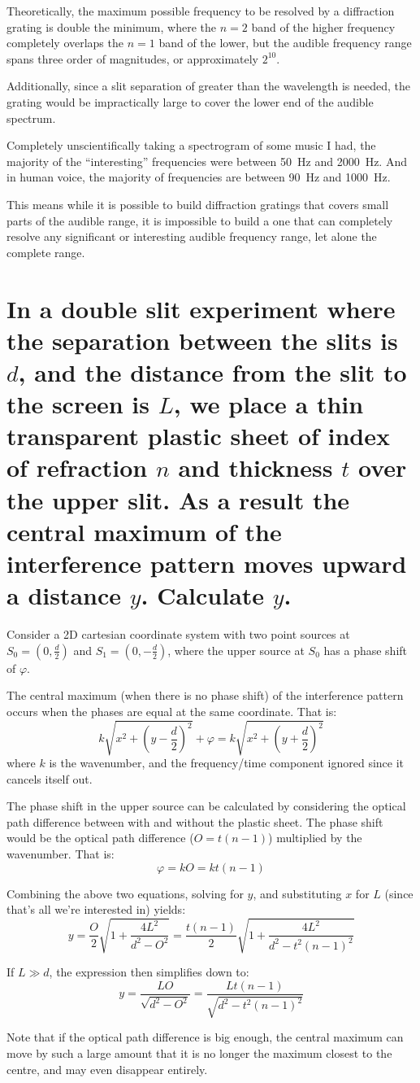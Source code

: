 \documentclass[a4paper]{scrartcl}
\begin{document}
Theoretically, the maximum possible frequency to be resolved by a diffraction grating is double the minimum, where the \(n = 2\) band of the higher frequency completely overlaps the \(n = 1\) band of the lower, but the audible frequency range spans three order of magnitudes, or approximately \(2^{10}\).

Additionally, since a slit separation of greater than the wavelength is needed, the grating would be impractically large to cover the lower end of the audible spectrum.

Completely unscientifically taking a spectrogram of some music I had, the majority of the ``interesting'' frequencies were between \SI{50}{\hertz} and \SI{2000}{\hertz}. And in human voice, the majority of frequencies are between \SI{90}{\hertz} and \SI{1000}{\hertz}.

This means while it is possible to build diffraction gratings that covers small parts of the audible range, it is impossible to build a one that can completely resolve any significant or interesting audible frequency range, let alone the complete range.

\section{In a double slit experiment where the separation between the slits is \(d\), and the distance from the slit to the screen is \(L\), we place a thin transparent plastic sheet of index of refraction \(n\) and thickness \(t\) over the upper slit. As a result the central maximum of the interference pattern moves upward a distance \(y\). Calculate \(y\).}
Consider a 2D cartesian coordinate system with two point sources at \(S_0 = (0, \frac{d}{2})\) and \(S_1 = (0, -\frac{d}{2})\), where the upper source at \(S_0\) has a phase shift of \(\varphi\).

The central maximum (when there is no phase shift) of the interference pattern occurs when the phases are equal at the same coordinate. That is:
\[k \sqrt{x^2 + \left( y - \frac{d}{2} \right)^2} + \varphi = k \sqrt{x^2 + \left( y + \frac{d}{2} \right)^2}\]
where \(k\) is the wavenumber, and the frequency/time component ignored since it cancels itself out.

The phase shift in the upper source can be calculated by considering the optical path difference between with and without the plastic sheet. The phase shift would be the optical path difference (\(O = t (n - 1)\)) multiplied by the wavenumber. That is:
\[\varphi = k O = k t (n - 1)\]

Combining the above two equations, solving for \(y\), and substituting \(x\) for \(L\) (since that's all we're interested in) yields:
\[y = \frac{O}{2}\sqrt{1 + \frac{4 L^2}{d^2 - O^2}} = \frac{t (n - 1)}{2}\sqrt{1 + \frac{4 L^2}{d^2 - t^2 (n - 1)^2}}\]

If \(L \gg d\), the expression then simplifies down to:
\[y = \frac{L O}{\sqrt{d^2 - O^2}} = \frac{L t (n - 1)}{\sqrt{d^2 - t^2 (n - 1)^2}}\]

Note that if the optical path difference is big enough, the central maximum can move by such a large amount that it is no longer the maximum closest to the centre, and may even disappear entirely.
\end{document}
